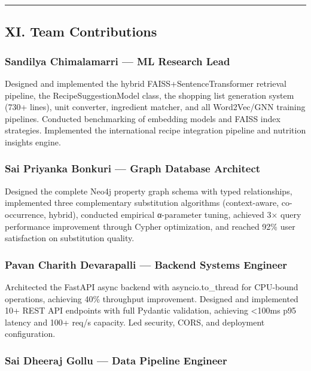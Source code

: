 \documentclass[10pt,conference,compsoc]{IEEEtran}
\begin{document}
\begin{center}\rule{0.5\linewidth}{0.5pt}\end{center}

\subsection{XI. Team Contributions}\label{xi.-team-contributions}

\subsubsection{Sandilya Chimalamarri --- ML Research
Lead}\label{sandilya-chimalamarri-ml-research-lead}

Designed and implemented the hybrid FAISS+SentenceTransformer retrieval
pipeline, the RecipeSuggestionModel class, the shopping list generation
system (730+ lines), unit converter, ingredient matcher, and all
Word2Vec/GNN training pipelines. Conducted benchmarking of embedding
models and FAISS index strategies. Implemented the international recipe
integration pipeline and nutrition insights engine.

\subsubsection{Sai Priyanka Bonkuri --- Graph Database
Architect}\label{sai-priyanka-bonkuri-graph-database-architect}

Designed the complete Neo4j property graph schema with typed
relationships, implemented three complementary substitution algorithms
(context-aware, co-occurrence, hybrid), conducted empirical α-parameter
tuning, achieved 3× query performance improvement through Cypher
optimization, and reached 92\% user satisfaction on substitution
quality.

\subsubsection{Pavan Charith Devarapalli --- Backend Systems
Engineer}\label{pavan-charith-devarapalli-backend-systems-engineer}

Architected the FastAPI async backend with asyncio.to\_thread for
CPU-bound operations, achieving 40\% throughput improvement. Designed
and implemented 10+ REST API endpoints with full Pydantic validation,
achieving \textless100ms p95 latency and 100+ req/s capacity. Led
security, CORS, and deployment configuration.

\subsubsection{Sai Dheeraj Gollu --- Data Pipeline
Engineer}\label{sai-dheeraj-gollu-data-pipeline-engineer}
\end{document}
